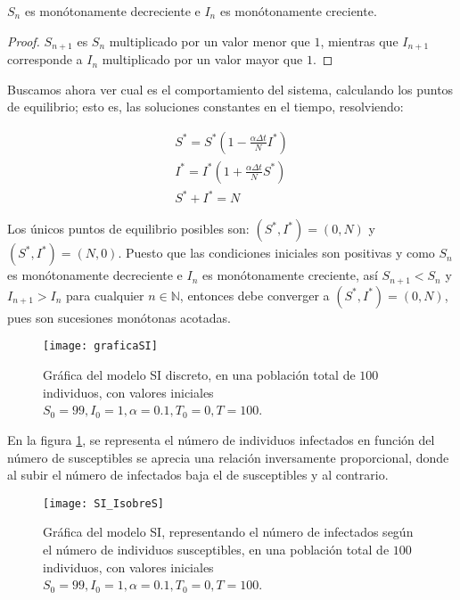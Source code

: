 \begin{lemma}
$S_n$ es monótonamente decreciente e $I_n$ es monótonamente creciente.
\end{lemma}

\begin{proof}
$S_{n+1}$ es $S_n$ multiplicado por un valor menor que $1$, mientras que $I_{n+1}$ corresponde a $I_n$ multiplicado por un valor mayor que $1$.
\end{proof}

Buscamos ahora ver cual es el comportamiento del sistema, calculando los puntos de equilibrio; esto es, las soluciones constantes en el tiempo, resolviendo:

$$
\begin{aligned}
S^*=S^*\left( 1-\frac{\alpha\Delta t}{N}I^*\right) \\
I^*=I^*\left( 1+\frac{\alpha\Delta t}{N}S^*\right) \\
S^*+I^*=N
\end{aligned}
$$

Los únicos puntos de equilibrio posibles son: $(S^*,I^*)=(0,N)$ y $(S^*,I^*)=(N,0)$. Puesto que las condiciones iniciales son positivas y como $S_n$ es monótonamente decreciente e $I_n$ es monótonamente creciente, así $S_{n+1}<S_n$ y $I_{n+1}>I_n$ para cualquier $n\in\mathbb{N}$, entonces debe converger a $(S^*,I^*)=(0,N)$, pues son sucesiones monótonas acotadas.



\begin{figure}
\begin{center}
\caption{Gráfica del modelo SI discreto, en una población total de $100$ individuos, con valores iniciales $S_0=99, I_0 = 1, \alpha = 0.1, T_0 = 0, T = 100$.}
\texttt{[image: graficaSI]}
\end{center}
\end{figure}

En la figura \ref{fig: SI_IsobreS}, se representa el número de individuos infectados en función del número de susceptibles se aprecia una relación inversamente proporcional, donde al subir el número de infectados baja el de susceptibles y al contrario.

\begin{figure}
\begin{center}
\caption{Gráfica del modelo SI, representando el número de infectados según el número de individuos susceptibles, en una población total de $100$ individuos, con valores iniciales $S_0=99, I_0 = 1, \alpha = 0.1, T_0 = 0, T = 100$.}
\label{fig: SI_IsobreS}
\texttt{[image: SI\_IsobreS]}
\end{center}
\end{figure}

